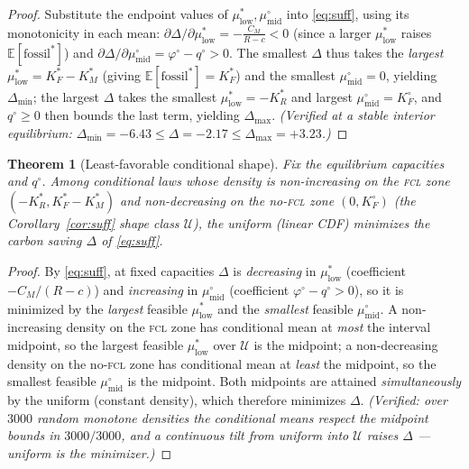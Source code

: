 \documentclass[11pt,reqno]{amsart}
\theoremstyle{plain}
\newtheorem{theorem}{Theorem}
\theoremstyle{definition}
\theoremstyle{remark}
\newcommand{\KRs}{K_R^{*}}
\newcommand{\KFs}{K_F^{*}}
\newcommand{\KMs}{K_M^{*}}
\newcommand{\KFo}{K_F^{\circ}}
\newcommand{\CM}{C_M}
\newcommand{\E}{\mathbb{E}}
\newcommand{\Ucal}{\mathcal U}
\begin{document}
\begin{proof}
Substitute the endpoint values of $\mu^{*}_{\mathrm{low}},\mu^{\circ}_{\mathrm{mid}}$
into \eqref{eq:suff}, using its monotonicity in each mean:
$\partial\Delta/\partial\mu^{*}_{\mathrm{low}}=-\tfrac{\CM}{R-c}<0$ (since a larger
$\mu^{*}_{\mathrm{low}}$ raises $\E[\text{fossil}^{*}]$) and
$\partial\Delta/\partial\mu^{\circ}_{\mathrm{mid}}=\varphi^{\circ}-q^{\circ}>0$. The
smallest $\Delta$ thus takes the \emph{largest} $\mu^{*}_{\mathrm{low}}=\KFs-\KMs$
(giving $\E[\text{fossil}^{*}]=\KFs$) and the smallest $\mu^{\circ}_{\mathrm{mid}}=0$,
yielding $\Delta_{\min}$; the largest $\Delta$ takes the smallest
$\mu^{*}_{\mathrm{low}}=-\KRs$ and largest $\mu^{\circ}_{\mathrm{mid}}=\KFo$, and
$q^{\circ}\ge0$ then bounds the last term, yielding $\Delta_{\max}$. \emph{(Verified
at a stable interior equilibrium: $\Delta_{\min}=-6.43\le\Delta=-2.17\le\Delta_{\max}=+3.23$.)}
\end{proof}

\begin{theorem}[Least-favorable conditional shape]\label{thm:lfd}
Fix the equilibrium capacities and $q^{\circ}$. Among conditional laws whose
density is non-increasing on the \textsc{fcl} zone $(-\KRs,\KFs-\KMs)$ and
non-decreasing on the no-\textsc{fcl} zone $(0,\KFo)$ (the
Corollary~\ref{cor:suff} shape class $\Ucal$), the \emph{uniform} (linear CDF)
minimizes the carbon saving $\Delta$ of \eqref{eq:suff}.
\end{theorem}

\begin{proof}
By \eqref{eq:suff}, at fixed capacities $\Delta$ is \emph{decreasing} in
$\mu^{*}_{\mathrm{low}}$ (coefficient $-\CM/(R-c)$) and \emph{increasing} in
$\mu^{\circ}_{\mathrm{mid}}$ (coefficient $\varphi^{\circ}-q^{\circ}>0$), so it is
minimized by the \emph{largest} feasible $\mu^{*}_{\mathrm{low}}$ and the
\emph{smallest} feasible $\mu^{\circ}_{\mathrm{mid}}$. A non-increasing density on
the \textsc{fcl} zone has conditional mean at \emph{most} the interval midpoint, so
the largest feasible $\mu^{*}_{\mathrm{low}}$ over $\Ucal$ is the midpoint; a
non-decreasing density on the no-\textsc{fcl} zone has conditional mean at
\emph{least} the midpoint, so the smallest feasible $\mu^{\circ}_{\mathrm{mid}}$ is
the midpoint. Both midpoints are attained \emph{simultaneously} by the uniform
(constant density), which therefore minimizes $\Delta$. \emph{(Verified: over
$3000$ random monotone densities the conditional means respect the midpoint bounds
in $3000/3000$, and a continuous tilt from uniform into $\Ucal$ raises $\Delta$ ---
uniform is the minimizer.)}
\end{proof}
\end{document}
